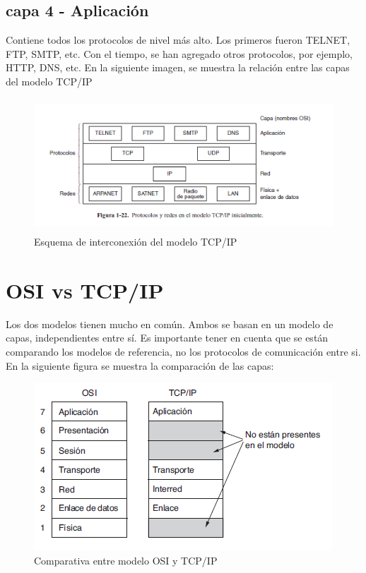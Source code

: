 \subsection{capa 4 - Aplicación}
Contiene todos los protocolos de nivel más alto. Los primeros fueron TELNET, FTP, SMTP, etc. Con el tiempo, se han agregado otros protocolos, por ejemplo, HTTP, DNS, etc. 
En la siguiente imagen, se muestra la relación entre las capas del modelo TCP/IP
\begin{figure}[ht]
	\centering
	\includegraphics[height=5.0cm]{cap_ap_tcpip}
	\caption{Esquema de interconexión del modelo TCP/IP}
\end{figure}


\section{OSI vs TCP/IP }

Los dos modelos tienen mucho en común. Ambos se basan en un modelo de capas, independientes entre sí. Es importante tener en cuenta que se están comparando los modelos de referencia, no los protocolos de comunicación entre si. En la siguiente figura se muestra la comparación de las capas:  

\begin{figure}[ht]
	\centering 
	\includegraphics{comptcposi}
	\caption{Comparativa entre modelo OSI y TCP/IP}
	\label{fig:comp_tcposi}
\end{figure}

